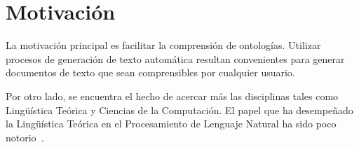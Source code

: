 \documentclass[11pt,a4paper,spanish]{book}
\begin{document}
\section{Motivación}
La motivación principal es facilitar la comprensión de ontologías. Utilizar procesos de generación de texto automática resultan convenientes para generar documentos de texto que sean comprensibles por cualquier usuario.

Por otro lado, se encuentra el hecho de acercar más las disciplinas tales como Lingüística Teórica y Ciencias de la Computación. El papel que ha desempeñado la Lingüística Teórica en el Procesamiento de Lenguaje Natural ha sido poco notorio~\cite{perinan2012defensa}.

















\end{document}
